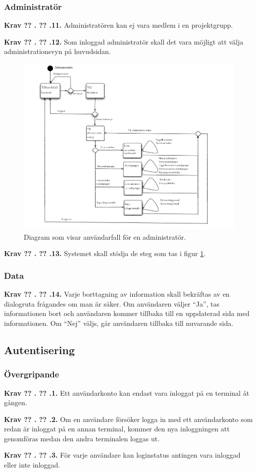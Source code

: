 \documentclass[a4paper]{article}
\newcommand\getcurrentref[1]{%
 \ifnumequal{\value{#1}}{0}
  {??}
  {\the\value{#1}}%
}
\newcommand\requirement[2]{
	\numberedrow{Krav}{#1}{#2}
}
\newcommand\numberedrow[3]{
	\noindent
	\textbf{#1 \getcurrentref{section}.\getcurrentref{subsection}.#2.} #3
	
}
\begin{document}
		\subsubsection*{Administratör}
		\requirement{11}{Administratören kan ej vara medlem i en projektgrupp. }
		\requirement{12}{Som inloggad administratör skall det vara möjligt att välja administrationsvyn på huvudsidan.}
			\begin{figure}[h!]
				\centering
				\includegraphics[width=\textwidth]{flow_common_admin}
				\caption{Diagram som visar användarfall för en administratör.}
				\label{image_gen_admin}
			\end{figure}
		\requirement{13}{Systemet skall stödja de steg som tas i figur \ref{image_gen_admin}.}
		\subsubsection*{Data}
		\requirement{14}{Varje borttagning av information skall bekräftas av en dialogruta frågandes om man är säker. Om användaren väljer ``Ja'', tas informationen bort och användaren kommer tillbaka till en uppdaterad sida med informationen. Om ``Nej'' väljs, går användaren tillbaka till nuvarande sida.}
		
		


	\subsection{Autentisering}
		\label{krav-funk-aut}
		\subsubsection*{Övergripande}
			\requirement{1}{Ett användarkonto kan endast vara inloggat på en terminal åt gången.}			
			\requirement{2}{Om en användare försöker logga in med ett användarkonto som redan är inloggat på en annan terminal, kommer den nya inloggningen att genomföras medan den andra terminalen loggas ut.}
			\requirement{3}{För varje användare kan loginstatus antingen vara inloggad eller inte inloggad.}
\end{document}
